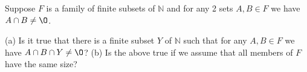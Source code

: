 Suppose $F$ is a family of finite subsets of $\mathbb{N}$ and for any 2 sets $A,B \in F$ we have $A \cap B \not= \O$.

(a) Is it true that there is a finite subset $Y$ of $\mathbb{N}$ such that for any $A,B \in F$ we have $A\cap B\cap Y \not= \O$?
(b) Is the above true if we assume that all members of $F$ have the same size?